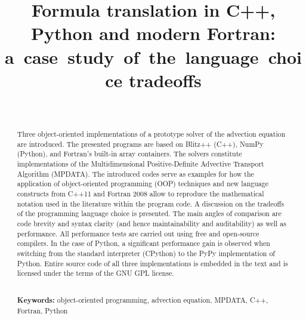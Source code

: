 \documentclass[twocolumn]{article}
\begin{document}
    \linenumbers

    \title{
      Formula translation in C++, Python and modern Fortran: a~case~study~of~the~language~choice tradeoffs
    }

    \author{~}


    \onecolumn
    \maketitle

    \begin{abstract}
        Three object-oriented implementations of a prototype solver of the advection equation are introduced.
        The presented programs are based on Blitz++ (C++), NumPy (Python), and Fortran's built-in array containers.
        The solvers constitute implementations of the Multidimensional Positive-Definite 
          Advective Transport Algorithm (MPDATA).
        The introduced codes serve as examples for how the application of 
          object-oriented programming (OOP) techniques and new language constructs from
          C++11 and Fortran 2008 allow to reproduce the mathematical notation 
          used in the literature within the program code.
        A discussion on the tradeoffs of the programming language choice is presented.
        The main angles of comparison are code brevity and syntax clarity
          (and hence maintainability and auditability) as well as performance.
        All performance tests are carried out using free and open-source compilers.
        In the case of Python, a significant performance gain is observed when switching from the standard 
          interpreter (CPython) to the PyPy implementation of Python.
        Entire source code of all three implementations is embedded in the text and is licensed
          under the terms of the GNU GPL license.
  
        ~\\
        {\bf Keywords:} object-oriented programming, advection equation, MPDATA, C++, Fortran, Python
    \end{abstract}
\end{document}
